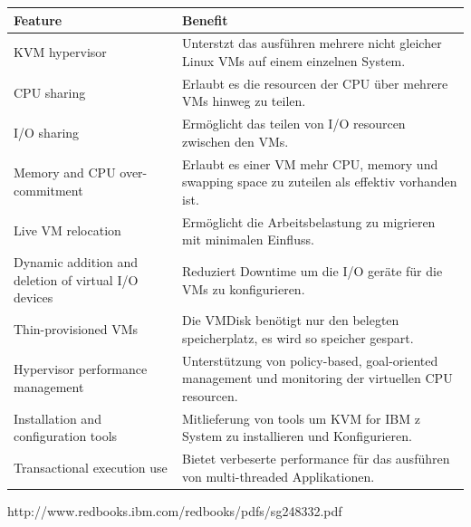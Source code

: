 \documentclass[14pt]{extreport}
\begin{document}
\begin{table}[]
\centering
\begin{tabular}{|p{5cm}|p{10cm}|}
\hline
\textbf{Feature}                                     & \textbf{Benefit}                                                                                      \\ \hline
KVM hypervisor                                       & Unterstzt das ausführen mehrere nicht gleicher Linux VMs auf einem einzelnen System.                  \\ \hline
CPU sharing                                          & Erlaubt es die resourcen der CPU über mehrere VMs hinweg zu teilen.                                   \\ \hline
I/O sharing                                          & Ermöglicht das teilen von I/O resourcen zwischen den VMs.                                             \\ \hline
Memory and CPU over-commitment                       & Erlaubt es einer VM mehr CPU, memory und swapping space zu zuteilen als effektiv vorhanden ist.       \\ \hline
Live VM relocation                                   & Ermöglicht die Arbeitsbelastung zu migrieren mit minimalen Einfluss.                                  \\ \hline
Dynamic addition and deletion of virtual I/O devices & Reduziert Downtime um die I/O geräte für die VMs zu konfigurieren.                                    \\ \hline
Thin-provisioned VMs                                 & Die VMDisk benötigt nur den belegten speicherplatz, es wird so speicher gespart.                      \\ \hline
Hypervisor performance management                    & Unterstützung von policy-based, goal-oriented management und monitoring der virtuellen CPU resourcen. \\ \hline
Installation and configuration tools                 & Mitlieferung von tools um KVM for IBM z System zu installieren und Konfigurieren.                     \\ \hline
Transactional execution use                          & Bietet verbeserte performance für das ausführen von multi-threaded Applikationen.                     \\ \hline
\end{tabular}
\end{table}
http://www.redbooks.ibm.com/redbooks/pdfs/sg248332.pdf
\end{document}
